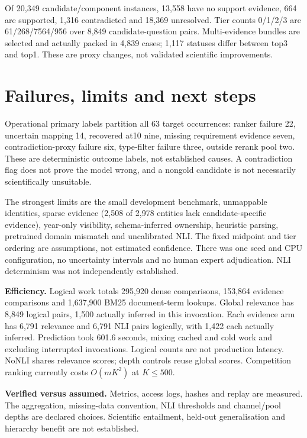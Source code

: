 \documentclass[11pt,a4paper]{article}
\begin{document}
Of 20,349 candidate/component instances, 13,558 have no support evidence, 664 are supported, 1,316 contradicted and 18,369 unresolved. Tier counts 0/1/2/3 are 61/268/7564/956 over 8,849 candidate-question pairs. Multi-evidence bundles are selected and actually packed in 4,839 cases; 1,117 statuses differ between top3 and top1. These are proxy changes, not validated scientific improvements.

\newpage
\section*{Failures, limits and next steps}
Operational primary labels partition all 63 target occurrences: ranker failure 22, uncertain mapping 14, recovered at10 nine, missing requirement evidence seven, contradiction-proxy failure six, type-filter failure three, outside rerank pool two. These are deterministic outcome labels, not established causes. A contradiction flag does not prove the model wrong, and a nongold candidate is not necessarily scientifically unsuitable.

The strongest limits are the small development benchmark, unmappable identities, sparse evidence (2,508 of 2,978 entities lack candidate-specific evidence), year-only visibility, schema-inferred ownership, heuristic parsing, pretrained domain mismatch and uncalibrated NLI. The fixed midpoint and tier ordering are assumptions, not estimated confidence. There was one seed and CPU configuration, no uncertainty intervals and no human expert adjudication. NLI determinism was not independently established.

\textbf{Efficiency.} Logical work totals 295,920 dense comparisons, 153,864 evidence comparisons and 1,637,900 BM25 document-term lookups. Global relevance has 8,849 logical pairs, 1,500 actually inferred in this invocation. Each evidence arm has 6,791 relevance and 6,791 NLI pairs logically, with 1,422 each actually inferred. Prediction took 601.6 seconds, mixing cached and cold work and excluding interrupted invocations. Logical counts are not production latency. NoNLI shares relevance scores; depth controls reuse global scores. Competition ranking currently costs $O(mK^2)$ at $K\le500$.

\textbf{Verified versus assumed.} Metrics, access logs, hashes and replay are measured. The aggregation, missing-data convention, NLI thresholds and channel/pool depths are declared choices. Scientific entailment, held-out generalisation and hierarchy benefit are not established.
\end{document}
